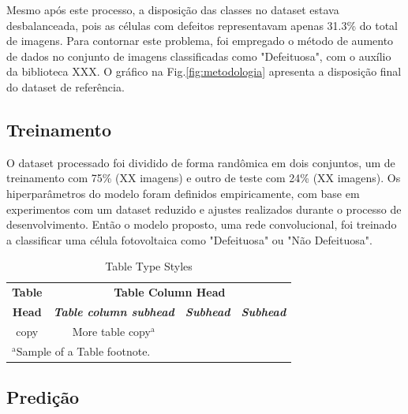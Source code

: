 \documentclass[conference]{IEEEtran}
\begin{document}
Mesmo após este processo, a disposição das classes no dataset
estava desbalanceada, pois as células com defeitos representavam apenas
31.3\% do total de imagens. Para contornar este problema, foi empregado
o método de aumento de dados no conjunto de imagens classificadas como
"Defeituosa", com o auxílio da biblioteca XXX. O gráfico na
Fig.\ref{fig:metodologia} apresenta a disposição final do dataset de
referência.

\subsection{Treinamento}\label{AA}

O dataset processado foi dividido de forma randômica em dois conjuntos, um de
treinamento
com 75\% (XX imagens) e outro de teste com 24\% (XX imagens). Os
hiperparâmetros do modelo foram definidos empiricamente, com base em
experimentos com um dataset
reduzido e ajustes realizados durante o processo de desenvolvimento. Então o
modelo proposto,
uma rede convolucional, foi treinado a classificar uma célula fotovoltaica como
"Defeituosa" ou "Não
Defeituosa".

\begin{table}[htbp]
    \caption{Table Type Styles}
    \begin{center}
        \begin{tabular}{|c|c|c|c|}
            \hline
            \textbf{Table}            & \multicolumn{3}{|c|}{\textbf{Table
                    Column Head}}
            \\
            \cline{2-4}
            \textbf{Head}             & \textbf{\textit{Table column subhead}}
                                      &
            \textbf{\textit{Subhead}} & \textbf{\textit{Subhead}}
            \\
            \hline
            copy                      & More table copy$^{\mathrm{a}}$
                                      &
                                      &
            \\
            \hline
            \multicolumn{4}{l}{$^{\mathrm{a}}$Sample of a Table footnote.}
        \end{tabular}
        \label{tab1}
    \end{center}
\end{table}
\subsection{Predição}\label{AA}
\end{document}
